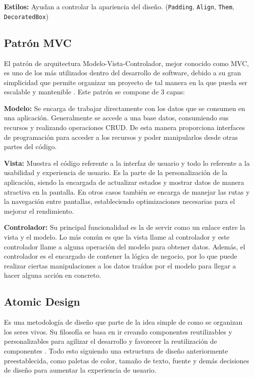 \textbf{Estilos:} Ayudan a controlar la apariencia del diseño. (\lstinline{Padding}, \lstinline{Align}, \lstinline{Them}, \lstinline{DecoratedBox})

\subsection{Patrón MVC}

El patrón de arquitectura Modelo-Vista-Controlador, mejor conocido como MVC, es uno de los más utilizados dentro del desarrollo de software, debido a su gran simplicidad que permite organizar un proyecto de tal manera en la que pueda ser escalable y mantenible \parencite{Alvarez2023}. Este patrón se compone de 3 capas:

\textbf{Modelo:} Se encarga de trabajar directamente con los datos que se consumen en una aplicación. Generalmente se accede a una base datos, consumiendo sus recursos y realizando operaciones CRUD. De esta manera proporciona interfaces de programación para acceder a los recursos y poder manipularlos desde otras partes del código.

\textbf{Vista:} Muestra el código referente a la interfaz de usuario y todo lo referente a la usabilidad y experiencia de usuario. Es la parte de la personalización de la aplicación, siendo la encargada de actualizar estados y mostrar datos de manera atractiva en la pantalla. En otros casos también se encarga de manejar las rutas y la navegación entre pantallas, estableciendo optimizaciones necesarias para el mejorar el rendimiento.

\textbf{Controlador:} Su principal funcionalidad es la de servir como un enlace entre la vista y el modelo. Lo más común es que la vista llame al controlador y este controlador llame a alguna operación del modelo para obtener datos. Además, el controlador es el encargado de contener la lógica de negocio, por lo que puede realizar ciertas manipulaciones a los datos traídos por el modelo para llegar a hacer alguna acción en concreto.

\subsection{Atomic Design}
Es una metodología de diseño que parte de la idea simple de como se organizan los seres vivos. Su filosofía se basa en ir creando componentes reutilizables y personalizables para agilizar el desarrollo y favorecer la reutilización de componentes \parencite{Garca2024}. Todo esto siguiendo una estructura de diseño anteriormente preestablecida, como paletas de color, tamaño de texto, fuente y demás decisiones de diseño para aumentar la experiencia de usuario.

